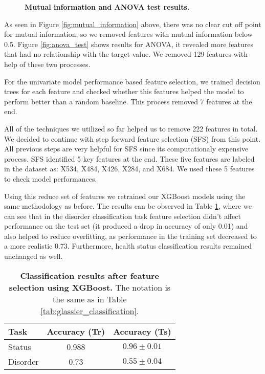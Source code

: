 \documentclass[fleqn,moreauthors,10pt]{ds_report}
\begin{document}
\begin{figure}[htbp]
    \centering
    \subfloat[]{
        
        \label{fig:mutual_information}
    }
    \subfloat[]{
        
        \label{fig:anova_test}
    }
    \caption{\textbf{Mutual information and ANOVA test results.}}
    \label{fig:joint_dist_grid}
\end{figure}
As seen in Figure \ref{fig:mutual_information} above, there was no clear cut off point for mutual information, so we removed features with mutual information below 0.5. Figure \ref{fig:anova_test} shows results for ANOVA, it revealed more features that had no relationship with the target value. We removed 129 features with help of these two processes.

For the univariate model performance based feature selection, we trained decision trees for each feature and checked whether this features helped the model to perform better than a random baseline. This process removed 7 features at the end.

All of the techniques we utilized so far helped us to remove 222 features in total. We decided to continue with step forward feature selection (SFS) from this point. All previous steps are very helpful for SFS since its computationaly expensive process. SFS identified 5 key features at the end. These five features are labeled in the dataset as: X534, X484, X426, X284, and X684. We used these 5 features to check model performances.

Using this reduce set of features we retrained our XGBoost models using the same methodology as before. The results can be observed in Table \ref{tab:feature_selection_results}, where we can see that in the disorder classification task feature selection didn't affect performance on the test set (it produced a drop in accuracy of only 0.01) and also helped to reduce overfitting, as performance in the training set decreased to a more realistic 0.73. Furthermore, health status classification results remained unchanged as well.

\begin{table}[h!]
\centering
\begin{tabular}{|l|c|c|}
\hline
\textbf{Task} & \textbf{Accuracy (Tr)} & \textbf{Accuracy (Ts)}\\ \hline
Status & 0.988 &  $0.96 \pm 0.01$ \\ \hline
Disorder & 0.73 & $0.55 \pm 0.04$ \\ \hline
\end{tabular}
\caption{\textbf{Classification results after feature selection using XGBoost.} The notation is the same as in Table \ref{tab:glassier_classification}.}
\label{tab:feature_selection_results}
\end{table}
\end{document}
